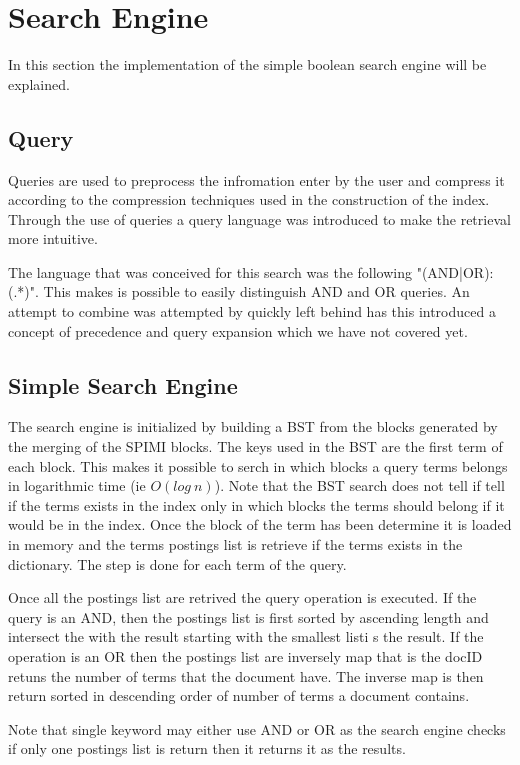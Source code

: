 \section{Search Engine}

In this section the implementation of the simple boolean search engine will be explained.

\subsection{Query}

\par Queries are used to preprocess the infromation enter by the user and compress it according to the compression techniques used in the construction of the index. Through the use of queries a query language was introduced to make the retrieval more intuitive.
\par The language that was conceived for this search was the following "(AND|OR):(.*)". This makes is possible to easily distinguish AND and OR queries. An attempt to combine was attempted by quickly left behind has this introduced a concept of precedence and query expansion which we have not covered yet.

\subsection{Simple Search Engine}

\par The search engine is initialized by building a BST from the blocks generated by the merging of the SPIMI blocks. The keys used in the BST are the first term of each block. This makes it possible to serch in which blocks a query terms belongs in logarithmic time (ie $O(log\ n)$). Note that the BST search does not tell if tell if the terms exists in the index only in which blocks the terms should belong if it would be in the index. Once the block of the term has been determine it is loaded in memory and the terms postings list is retrieve if the terms exists in the dictionary. The step is done for each term of the query.
\par Once all the postings list are retrived the query operation is executed. If the query is an AND, then the postings list is first sorted by ascending length and intersect the with the result starting with the smallest listi s the result. If the operation is an OR then the postings list are inversely map that is the docID retuns the number of terms that the document have. The inverse map is then return sorted in descending order of number of terms a document contains.
\par Note that single keyword may either use AND or OR as the search engine checks if only one postings list is return then it returns it as the results.

